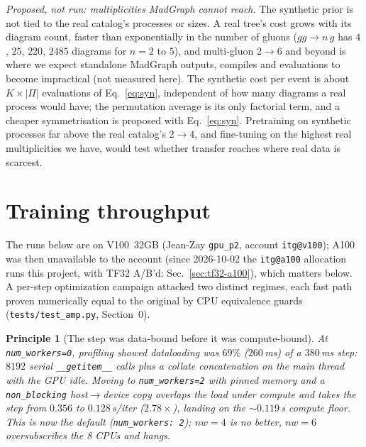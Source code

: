\documentclass[11pt]{article}
\newcommand{\code}[1]{\texttt{#1}}
\newtheorem{principle}{Principle}
\begin{document}
\par\smallskip\noindent \emph{Proposed, not run: multiplicities MadGraph cannot reach.} The synthetic prior is not tied to the real catalog's
processes or sizes. A real tree's cost grows with its diagram count, faster than exponentially in the number of gluons ($gg\to n\,g$
has $4$, $25$, $220$, $2485$ diagrams for $n=2$ to $5$), and multi-gluon $2\to6$ and beyond is where we expect standalone MadGraph
outputs, compiles and evaluations to become impractical (not measured here). The synthetic cost per event is about $K\times|\Pi|$ evaluations of
Eq.~\eqref{eq:syn}, independent of how many diagrams a real process would have; the permutation average is its only
factorial term, and a cheaper symmetrisation is proposed with Eq.~\eqref{eq:syn}. Pretraining on synthetic processes
far above the real catalog's $2\to4$, and fine-tuning on the highest real multiplicities we have, would test whether
transfer reaches where real data is scarcest.

\section{Training throughput}\label{sec:throughput}

The runs below are on V100~32GB (Jean-Zay \code{gpu\_p2}, account \code{itg@v100}); A100 was then
unavailable to the account (since 2026-10-02 the \code{itg@a100} allocation runs this project, with TF32 A/B'd:
Sec.~\ref{sec:tf32-a100}), which matters below. A per-step optimization campaign attacked two
distinct regimes, each fast path proven numerically equal to the original by CPU equivalence
guards (\code{tests/test\_amp.py}, Section~0).

\begin{principle}[The step was data-bound before it was compute-bound]\label{prin:dataloader}
At \code{num\_workers=0}, profiling showed dataloading was $69\%$ ($260$\,ms) of a $380$\,ms
step: $8192$ serial \code{\_\_getitem\_\_} calls plus a collate concatenation on the main
thread with the GPU idle. Moving to \code{num\_workers=2} with pinned memory and a
\code{non\_blocking} host$\to$device copy overlaps the load under compute and takes the step
from $0.356$ to $0.128$\,s/iter ($2.78\times$), landing on the $\sim0.119$\,s compute floor.
This is now the default (\code{num\_workers: 2}); $nw{=}4$ is no better, $nw{=}6$ oversubscribes
the 8 CPUs and hangs.
\end{principle}
\end{document}
